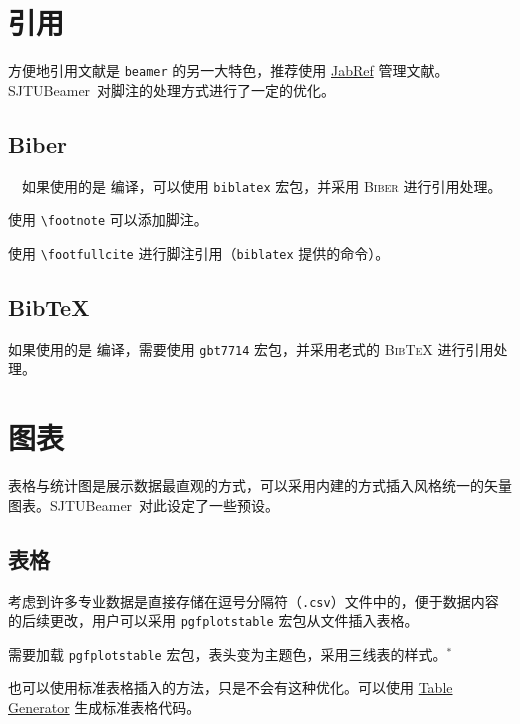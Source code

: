 \documentclass[
    UTF8,
    heading=true,
    12pt,
    a4paper
]{ctexrep}
\def\themename{\textsf{SJTUBeamer}}
\begin{document}
\chapter{引用}

方便地引用文献是 \texttt{beamer} 的另一大特色，推荐使用 \href{https://www.jabref.org/}{JabRef} 管理文献。\themename\ 对脚注的处理方式进行了一定的优化。

\section{Biber}

\faApple\ \faLinux\ 如果使用的是  编译，可以使用 \texttt{biblatex} 宏包，并采用 \textsc{Biber} 进行引用处理。


\begin{commentlist}
  \item 使用 \texttt{\textbackslash{}footnote} 可以添加脚注。
  \item 使用 \texttt{\textbackslash{}footfullcite} 进行脚注引用（\texttt{biblatex} 提供的命令）。
\end{commentlist}

\section{Bib\TeX{}}

\faWindows 如果使用的是  编译，需要使用 \texttt{gbt7714} 宏包，并采用老式的 \textsc{Bib\TeX{}} 进行引用处理。

\chapter{图表}

表格与统计图是展示数据最直观的方式，可以采用内建的方式插入风格统一的矢量图表。\themename\ 对此设定了一些预设。

\section{表格}

考虑到许多专业数据是直接存储在逗号分隔符（\texttt{.csv}）文件中的，便于数据内容的后续更改，用户可以采用 \texttt{pgfplotstable} 宏包从文件插入表格。


\begin{commentlist}
  \item 需要加载 \texttt{pgfplotstable} 宏包，表头变为主题色，采用三线表的样式。$^*$
  \item 也可以使用标准表格插入的方法，只是不会有这种优化。可以使用 \href{https://www.tablesgenerator.com/latex_tables}{Table Generator} 生成标准表格代码。
\end{commentlist}
\end{document}
